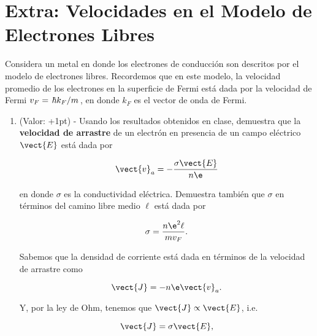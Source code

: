 \documentclass[./../main.tex]{subfiles}
\begin{document}
    \color{blue}
    \section{Extra: Velocidades en el Modelo de Electrones Libres}
        Considera un metal en donde los electrones de conducción son descritos por el modelo de electrones libres. Recordemos que en este modelo, la velocidad promedio de los electrones en la superficie de Fermi está dada por la velocidad de Fermi \(v_{F} = \slashfrac{\hbar k_{F}}{m}\), en donde \(k_{F}\) es el vector de onda de Fermi.

        \startsolution[print]

        \begin{enumerate}
            \item (Valor: +1pt) - Usando los resultados obtenidos en clase, demuestra que la \textbf{velocidad de arrastre} de un electrón en presencia de un campo eléctrico \(\vect{E}\) está dada por
            
            \begin{equation}
                \vect{v}_{a} = -\dfrac{\sigma\vect{E}}{n\e}
                \label{eq:DriftSpeed}
            \end{equation}

            en donde \(\sigma\) es la conductividad eléctrica. Demuestra también que \(\sigma\) en términos del camino libre medio \(\ell\) está dada por

            \begin{equation}
                \sigma = \dfrac{n\e^{2}\ell}{mv_{F}}.
                \label{eq:Conductivity}
            \end{equation}

            \color{black}
            
                Sabemos que la densidad de corriente está dada en términos de la velocidad de arrastre como

                \begin{equation}
                    \vect{J} = -n\e\vect{v}_{a}.
                    \label{eq:CurrentDensity}
                \end{equation}

                Y, por la ley de Ohm, tenemos que \(\vect{J} \propto \vect{E}\), i.e.

                \begin{equation}
                    \vect{J} = \sigma\vect{E},
                    \label{eq:OhmLawCurrentDensity}
                \end{equation}


\end{enumerate}
\end{document}
